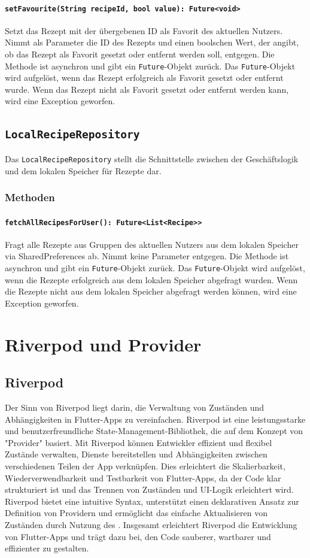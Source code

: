 \documentclass{entwurfsheft}
\begin{document}
\paragraph{\texttt{setFavourite(String recipeId, bool value): Future<void>}}
Setzt das Rezept mit der übergebenen ID als Favorit des aktuellen Nutzers. Nimmt als Parameter die ID des Rezepts und einen boolschen Wert, der angibt, ob das Rezept als Favorit gesetzt oder entfernt werden soll, entgegen. Die Methode ist asynchron und gibt ein \texttt{Future}-Objekt zurück. Das \texttt{Future}-Objekt wird aufgelöst, wenn das Rezept erfolgreich als Favorit gesetzt oder entfernt wurde. Wenn das Rezept nicht als Favorit gesetzt oder entfernt werden kann, wird eine Exception geworfen.
\newpage
\subsection{\texttt{LocalRecipeRepository}}\label{sec:LocalRecipeRepository}
Das \texttt{LocalRecipeRepository} stellt die Schnittstelle zwischen der Geschäftslogik und dem lokalen Speicher für Rezepte dar.
\subsubsection*{Methoden}
\paragraph{\texttt{fetchAllRecipesForUser(): Future<List<Recipe>>}}
Fragt alle Rezepte aus Gruppen des aktuellen Nutzers aus dem lokalen Speicher via \Gls{SharedPreferences} ab. Nimmt keine Parameter entgegen. Die Methode ist asynchron und gibt ein \texttt{Future}-Objekt zurück. Das \texttt{Future}-Objekt wird aufgelöst, wenn die Rezepte erfolgreich aus dem lokalen Speicher abgefragt wurden. Wenn die Rezepte nicht aus dem lokalen Speicher abgefragt werden können, wird eine Exception geworfen.
\newpage
\section{Riverpod und Provider}
\label{sec:riverpod}
\subsection{Riverpod}
Der Sinn von Riverpod liegt darin, die Verwaltung von Zuständen und Abhängigkeiten in Flutter-Apps zu vereinfachen. Riverpod ist eine leistungsstarke und benutzerfreundliche State-Management-Bibliothek, die auf dem Konzept von "Provider" basiert. Mit Riverpod können Entwickler effizient und flexibel Zustände verwalten, Dienste bereitstellen und Abhängigkeiten zwischen verschiedenen Teilen der App verknüpfen. Dies erleichtert die Skalierbarkeit, Wiederverwendbarkeit und Testbarkeit von Flutter-Apps, da der Code klar strukturiert ist und das Trennen von Zuständen und UI-Logik erleichtert wird. Riverpod bietet eine intuitive Syntax, unterstützt einen deklarativen Ansatz zur Definition von Providern und ermöglicht das einfache Aktualisieren von Zuständen durch Nutzung des . Insgesamt erleichtert Riverpod die Entwicklung von Flutter-Apps und trägt dazu bei, den Code sauberer, wartbarer und effizienter zu gestalten.
\end{document}
